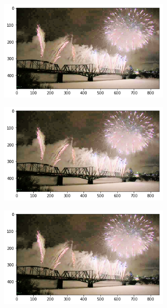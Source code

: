 \documentclass[10pt, a4paper]{article}
\begin{document}
\begin{figure}[H]	
	\centering
    \begin{subfigure}{0.3\textwidth}
        \includegraphics[width=0.9\textwidth]{fireworks-k4.png}
    \end{subfigure}\hfill
    	\centering
    \begin{subfigure}{0.3\textwidth}
        \includegraphics[width=0.9\textwidth]{fireworks-k8.png}
    \end{subfigure}\hfill	
    \centering
    \begin{subfigure}{0.3\textwidth}
        \includegraphics[width=0.9\textwidth]{fireworks-k16.png}
    \end{subfigure}\hfill
\end{figure}
\end{document}
